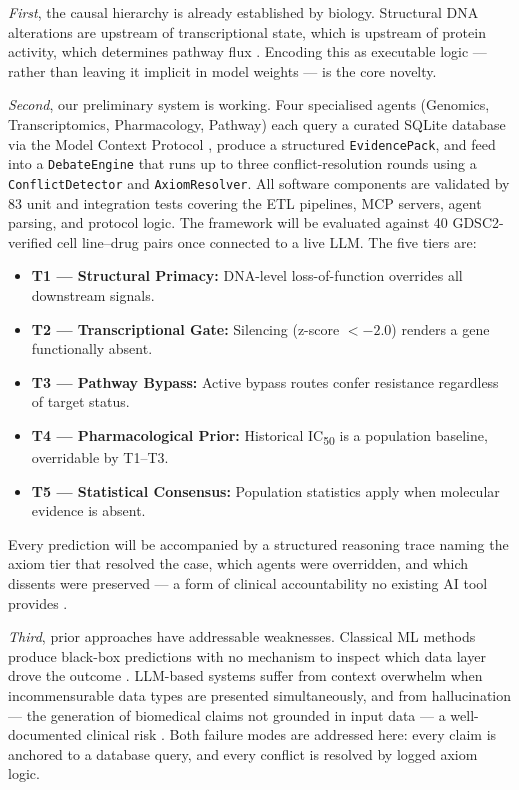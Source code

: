 \documentclass[12pt, letterpaper]{article}
\begin{document}
\textit{First}, the causal hierarchy is already established by biology. Structural DNA alterations
are upstream of transcriptional state, which is upstream of protein activity, which determines
pathway flux \cite{liu2025multiomics, carli2025cellhit}. Encoding this as executable logic --- rather
than leaving it implicit in model weights --- is the core novelty.

\textit{Second}, our preliminary system is working. Four specialised agents (Genomics,
Transcriptomics, Pharmacology, Pathway) each query a curated SQLite database via the Model Context
Protocol \cite{flotho2026mcpmed, widjaja2025bioinformcp}, produce a structured \texttt{EvidencePack},
and feed into a \texttt{DebateEngine} that runs up to three conflict-resolution rounds using a
\texttt{ConflictDetector} and \texttt{AxiomResolver}. All software components are validated by 83 unit and integration tests covering the ETL pipelines,
MCP servers, agent parsing, and protocol logic. The framework will be evaluated against 40
GDSC2-verified cell line--drug pairs once connected to a live LLM. The five tiers are:

\begin{itemize}[leftmargin=1.5em, itemsep=0pt, topsep=2pt]
    \item \textbf{T1 --- Structural Primacy:} DNA-level loss-of-function overrides all downstream signals.
    \item \textbf{T2 --- Transcriptional Gate:} Silencing (z-score $< -2.0$) renders a gene functionally absent.
    \item \textbf{T3 --- Pathway Bypass:} Active bypass routes confer resistance regardless of target status.
    \item \textbf{T4 --- Pharmacological Prior:} Historical IC\textsubscript{50} is a population baseline, overridable by T1--T3.
    \item \textbf{T5 --- Statistical Consensus:} Population statistics apply when molecular evidence is absent.
\end{itemize}

Every prediction will be accompanied by a structured reasoning trace naming the axiom tier that
resolved the case, which agents were overridden, and which dissents were preserved --- a form of
clinical accountability no existing AI tool provides \cite{evomdt2026, han2024consensus,
lorenzo2026oncotimia}.

\textit{Third}, prior approaches have addressable weaknesses. Classical ML methods produce
black-box predictions with no mechanism to inspect which data layer drove the outcome
\cite{saranya2024drncdr, zhao2023msdrp}. LLM-based systems suffer from context overwhelm when
incommensurable data types are presented simultaneously, and from hallucination --- the generation
of biomedical claims not grounded in input data --- a well-documented clinical risk
\cite{kim2025hallucination, nishisako2025hallucination}. Both failure modes are addressed here:
every claim is anchored to a database query, and every conflict is resolved by logged axiom logic.
\end{document}
